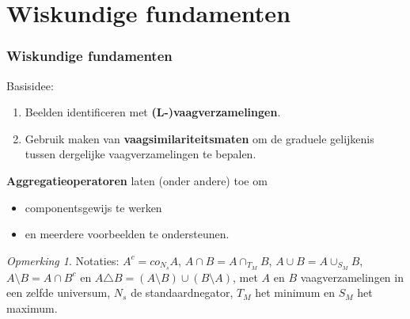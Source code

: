 \documentclass[dutch]{beamer}
\theoremstyle{definition}
\theoremstyle{remark}
\newtheorem{opmerking}[theorem]{Opmerking}
\theoremstyle{example}
\begin{document}
\section{Wiskundige fundamenten}
\frame
{
  \frametitle{Wiskundige fundamenten}

  Basisidee:
  \begin{enumerate}
  \item Beelden identificeren met \textbf{(L-)vaagverzamelingen}.
  \item Gebruik maken van \textbf{vaagsimilariteitsmaten} om de graduele 
  gelijkenis tussen dergelijke vaagverzamelingen te bepalen.
  \end{enumerate}
  
  \textbf{Aggregatieoperatoren} laten (onder andere) toe om
  \begin{itemize}
  \item componentsgewijs te werken
  \item en meerdere voorbeelden te ondersteunen.
  \end{itemize}
  
  \begin{opmerking}
  Notaties: $A^c = co_{N_s} A$, $A \cap B = A \cap_{T_M} B$, $A \cup B = A \cup_{S_M} B$,
  $A \setminus B = A \cap B^c$ en $A \triangle B = (A \setminus B) \cup (B \setminus A)$,
  met $A$ en $B$ vaagverzamelingen in een zelfde universum, $N_s$ de standaardnegator, 
  $T_M$ het minimum en $S_M$ het maximum.
  \end{opmerking}
}
\end{document}
